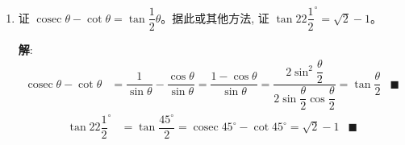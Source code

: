 \documentclass{report}
\newcommand{\sol}{\vspace{0.2cm}\textbf{解}:}
\begin{document}
\begin{enumerate}[leftmargin=*]
        \sol{}
        \begin{align*}
            \sin ^2 \theta+6 \sin \theta \cos \theta+9 \cos ^2 \theta &=\dfrac{1 - \cos 2\theta}{2} + 3\cdot 2\sin\theta\cos\theta + 9\left(\dfrac{1 + \cos 2\theta}{2}\right)\\
            &=\dfrac{1 - \cos 2\theta + 9 + 9\cos 2\theta}{2} + 3\sin 2\theta\\
            &=5 + 3\sin 2\theta + 4\cos 2\theta\\
            \therefore\ &a = 5, b = 3, c = 4 & \blacksquare
        \end{align*}
        \begin{align*}
            \dfrac{d}{d\theta}(5 + 3\sin 2\theta + 4\cos 2\theta) &= 6\cos 2\theta - 8\sin 2\theta = 0\\
            \tan 2\theta &= \dfrac{3}{4}\\
            2\theta &= k\pi + \arctan\dfrac{3}{4}\\
            \theta &= \dfrac{k\pi}{2} + \dfrac{1}{2}\arctan\dfrac{3}{4}\\
            \dfrac{d^2}{d\theta^2}(5 + 3\sin 2\theta + 4\cos 2\theta) &= -6\sin 2\theta - 8\cos 2\theta\\
        \end{align*}
        When $k = 0$, $\theta = \dfrac{1}{2}\arctan\dfrac{3}{4}$, $\dfrac{d^2}{d\theta^2} = -6\sin\arctan\dfrac{3}{4} - 8\cos\arctan\dfrac{3}{4} = -3.02 < 0$.

        Hence, the max value is $5 + 3\sin 2\theta + 4\cos 2\theta = 5 + 3\sin\arctan\dfrac{3}{4} + 4\cos\arctan\dfrac{3}{4} = 10$. \hfill $\blacksquare$

        When $k = 1$, $\theta = \dfrac{\pi}{2} + \dfrac{1}{2}\arctan\dfrac{3}{4}$, $\dfrac{d^2}{d\theta^2} = -6\sin\left(\pi + \arctan\dfrac{3}{4}\right) - 8\cos\left(\pi + \arctan\dfrac{3}{4}\right) = 3.02 > 0$.

        Hence, the min value is $5 + 3\sin 2\theta + 4\cos 2\theta = 5 + 3\sin\left(\pi + \arctan\dfrac{3}{4}\right) + 4\cos\left(\pi + \arctan\dfrac{3}{4}\right) = 0$. \hfill $\blacksquare$
        
        \item 证 $\operatorname{cosec} \theta-\cot \theta=\tan \dfrac{1}{2} \theta$。据此或其他方法, 证 $\tan 22 \dfrac{1}{2}^{\circ}=\sqrt{2}-1$。
        
        \sol{}
        \begin{align*}
            \operatorname{cosec}\theta - \cot\theta &= \dfrac{1}{\sin\theta} - \dfrac{\cos\theta}{\sin\theta} = \dfrac{1-\cos\theta}{\sin\theta} = \dfrac{2\sin^2\dfrac{\theta}{2}}{2\sin\dfrac{\theta}{2}\cos\dfrac{\theta}{2}} = \tan\dfrac{\theta}{2} & \blacksquare
        \end{align*}
        \begin{align*}
            \tan 22 \dfrac{1}{2}^{\circ} &= \tan\dfrac{45^{\circ}}{2} = \operatorname{cosec}45^{\circ} - \cot45^{\circ} = \sqrt{2} - 1 & \blacksquare
        \end{align*}


\end{enumerate}
\end{document}
